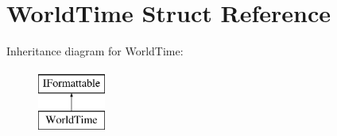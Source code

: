 \hypertarget{struct_world_time}{}\section{World\+Time Struct Reference}
\label{struct_world_time}
Inheritance diagram for World\+Time\+:\begin{figure}[H]
\begin{center}
\leavevmode
\includegraphics[height=2.000000cm]{struct_world_time}
\end{center}
\end{figure}
